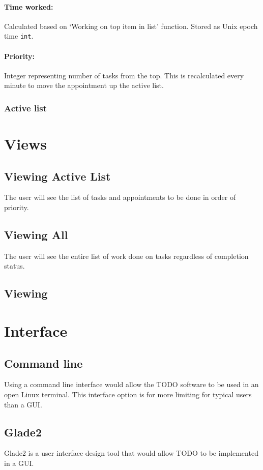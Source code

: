 \documentclass[12pt]{article}
\newcommand{\e}[1] {{\tt #1}}
\begin{document}
\paragraph{Time worked:} Calculated based on `Working on top item in list' function. Stored as Unix epoch time \e{int}. 
\paragraph{Priority:} Integer representing number of tasks from the top. This is recalculated every minute to move the appointment up the active list.

\subsubsection{Active list} \label{sec:Active list}


\section{Views}
\subsection{Viewing Active List}
The user will see the list of tasks and appointments to be done in order of priority.

\subsection{Viewing All}
The user will see the entire list of work done on tasks regardless of completion status.

\subsection{Viewing }

\section{Interface}
\subsection{Command line}
Using a command line interface would allow the TODO software to be used in an open Linux terminal. This interface option is for more limiting for typical users than a GUI.

\subsection{Glade2}
Glade2 is a user interface design tool that would allow TODO to be implemented in a GUI.  
\end{document}
